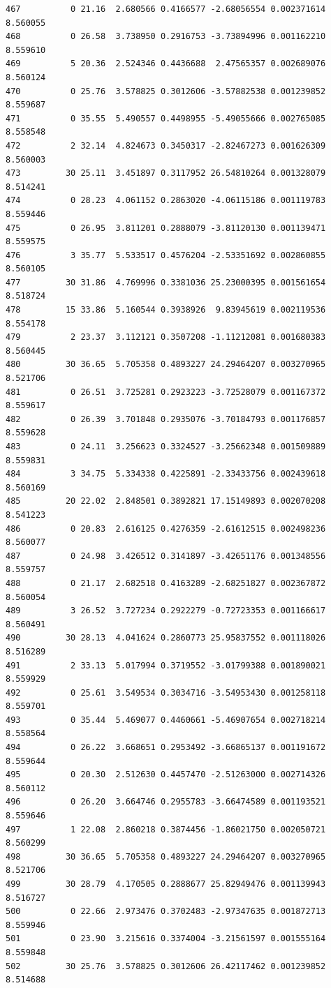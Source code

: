 \documentclass[]{book}
\theoremstyle{definition}
\theoremstyle{definition}
\theoremstyle{definition}
\theoremstyle{remark}
\begin{document}
\begin{verbatim}
467          0 21.16  2.680566 0.4166577 -2.68056554 0.002371614 8.560055
468          0 26.58  3.738950 0.2916753 -3.73894996 0.001162210 8.559610
469          5 20.36  2.524346 0.4436688  2.47565357 0.002689076 8.560124
470          0 25.76  3.578825 0.3012606 -3.57882538 0.001239852 8.559687
471          0 35.55  5.490557 0.4498955 -5.49055666 0.002765085 8.558548
472          2 32.14  4.824673 0.3450317 -2.82467273 0.001626309 8.560003
473         30 25.11  3.451897 0.3117952 26.54810264 0.001328079 8.514241
474          0 28.23  4.061152 0.2863020 -4.06115186 0.001119783 8.559446
475          0 26.95  3.811201 0.2888079 -3.81120130 0.001139471 8.559575
476          3 35.77  5.533517 0.4576204 -2.53351692 0.002860855 8.560105
477         30 31.86  4.769996 0.3381036 25.23000395 0.001561654 8.518724
478         15 33.86  5.160544 0.3938926  9.83945619 0.002119536 8.554178
479          2 23.37  3.112121 0.3507208 -1.11212081 0.001680383 8.560445
480         30 36.65  5.705358 0.4893227 24.29464207 0.003270965 8.521706
481          0 26.51  3.725281 0.2923223 -3.72528079 0.001167372 8.559617
482          0 26.39  3.701848 0.2935076 -3.70184793 0.001176857 8.559628
483          0 24.11  3.256623 0.3324527 -3.25662348 0.001509889 8.559831
484          3 34.75  5.334338 0.4225891 -2.33433756 0.002439618 8.560169
485         20 22.02  2.848501 0.3892821 17.15149893 0.002070208 8.541223
486          0 20.83  2.616125 0.4276359 -2.61612515 0.002498236 8.560077
487          0 24.98  3.426512 0.3141897 -3.42651176 0.001348556 8.559757
488          0 21.17  2.682518 0.4163289 -2.68251827 0.002367872 8.560054
489          3 26.52  3.727234 0.2922279 -0.72723353 0.001166617 8.560491
490         30 28.13  4.041624 0.2860773 25.95837552 0.001118026 8.516289
491          2 33.13  5.017994 0.3719552 -3.01799388 0.001890021 8.559929
492          0 25.61  3.549534 0.3034716 -3.54953430 0.001258118 8.559701
493          0 35.44  5.469077 0.4460661 -5.46907654 0.002718214 8.558564
494          0 26.22  3.668651 0.2953492 -3.66865137 0.001191672 8.559644
495          0 20.30  2.512630 0.4457470 -2.51263000 0.002714326 8.560112
496          0 26.20  3.664746 0.2955783 -3.66474589 0.001193521 8.559646
497          1 22.08  2.860218 0.3874456 -1.86021750 0.002050721 8.560299
498         30 36.65  5.705358 0.4893227 24.29464207 0.003270965 8.521706
499         30 28.79  4.170505 0.2888677 25.82949476 0.001139943 8.516727
500          0 22.66  2.973476 0.3702483 -2.97347635 0.001872713 8.559946
501          0 23.90  3.215616 0.3374004 -3.21561597 0.001555164 8.559848
502         30 25.76  3.578825 0.3012606 26.42117462 0.001239852 8.514688

\end{verbatim}
\end{document}
